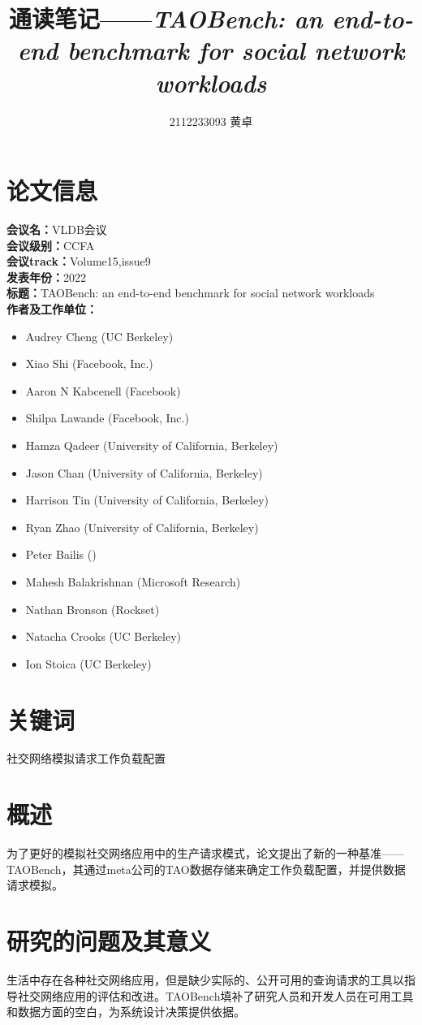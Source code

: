 \documentclass[a4paper]{article}
\title{通读笔记——\emph{TAOBench: an end-to-end benchmark for social network workloads}}
\author{2112233093 黄卓}
\begin{document}
\maketitle
\section{论文信息}
\textbf{会议名：}VLDB会议\\
\textbf{会议级别：}CCFA\\
\textbf{会议track：}Volume15,issue9\\
\textbf{发表年份：}2022\\
\textbf{标题：}TAOBench: an end-to-end benchmark for social network workloads\\
\textbf{作者及工作单位：}
\begin{itemize}
\item Audrey Cheng (UC Berkeley)
  \item Xiao Shi (Facebook, Inc.)
  \item Aaron N Kabcenell (Facebook)
 \item Shilpa Lawande (Facebook, Inc.)
  \item Hamza Qadeer (University of California, Berkeley)
 \item Jason Chan (University of California, Berkeley)
  \item Harrison Tin (University of California, Berkeley)
 \item Ryan Zhao (University of California, Berkeley)
\item Peter Bailis ()
\item Mahesh Balakrishnan (Microsoft Research)
\item Nathan Bronson (Rockset)
\item Natacha Crooks (UC Berkeley)
\item Ion Stoica (UC Berkeley)
\end{itemize}
\section{关键词}
社交网络\hspace{2em}模拟请求\hspace{2em}工作负载配置
\section{概述}
为了更好的模拟社交网络应用中的生产请求模式，论文提出了新的一种基准——TAOBench，其通过meta公司的TAO数据存储来确定工作负载配置，并提供数据请求模拟。
\section{研究的问题及其意义}
生活中存在各种社交网络应用，但是缺少实际的、公开可用的查询请求的工具以指导社交网络应用的评估和改进。TAOBench填补了研究人员和开发人员在可用工具和数据方面的空白，为系统设计决策提供依据。
\end{document}
